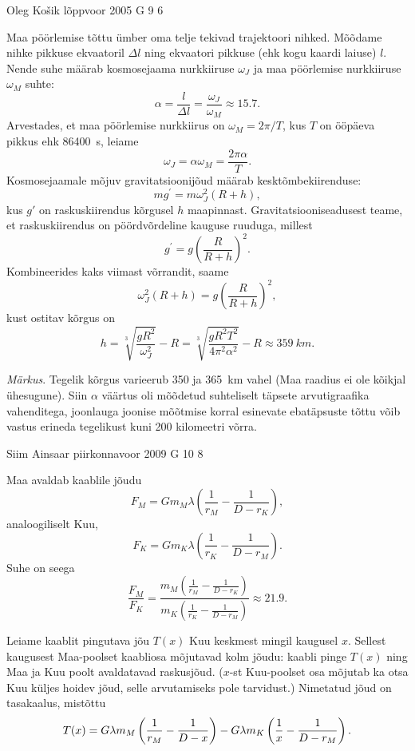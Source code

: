 \documentclass[11pt, twoside]{article}
\begin{document}
{%
{Oleg Košik} %
{lõppvoor} %
{2005} %
{G 9} %
{6} %
{

\ifSolution
Maa pöörlemise tõttu ümber oma telje tekivad trajektoori nihked. Mõõdame nihke pikkuse ekvaatoril $\Delta l$ ning ekvaatori pikkuse (ehk kogu kaardi laiuse) $l$. Nende suhe määrab kosmosejaama nurkkiiruse $\omega_J$ ja maa pöörlemise nurkkiiruse $\omega_M$ suhte:
\[
\alpha=\frac{l}{\Delta l}=\frac{\omega_{J}}{\omega_{M}} \approx \num{15,7}.
\]
Arvestades, et maa pöörlemise nurkkiirus on $\omega_M = 2\pi /T$, kus $T$ on ööpäeva pikkus ehk \SI{86400}{s}, leiame
\[
\omega_J = \alpha \omega_M = \frac{2\pi\alpha}{T}.
\]
Kosmosejaamale mõjuv gravitatsioonijõud määrab kesktõmbekiirenduse:
\[
m g^{\prime}=m \omega_{J}^{2}(R+h),
\]
kus $g'$ on raskuskiirendus kõrgusel $h$ maapinnast. Gravitatsiooniseadusest teame, et raskuskiirendus on pöördvõrdeline kauguse ruuduga, millest
\[
g^{\prime}=g\left(\frac{R}{R+h}\right)^{2}.
\]
Kombineerides kaks viimast võrrandit, saame
\[
\omega_{J}^{2}(R+h)=g\left(\frac{R}{R+h}\right)^{2},
\]
kust ostitav kõrgus on
\[
h=\sqrt[3]{\frac{g R^{2}}{\omega_{J}^{2}}}-R=\sqrt[3]{\frac{g R^{2} T^{2}}{4 \pi^{2} \alpha^{2}}}-R \approx \SI{359}{km}.
\]

\emph{Märkus}. Tegelik kõrgus varieerub \num{350} ja \SI{365}{km} vahel (Maa raadius ei ole kõikjal ühesugune). Siin $\alpha$ väärtus oli mõõdetud suhteliselt täpsete arvutigraafika vahenditega, joonlauga joonise mõõtmise korral esinevate ebatäpsuste tõttu võib vastus erineda tegelikust kuni \num{200} kilomeetri võrra. 
\fi
}

{Siim Ainsaar} %
{piirkonnavoor} %
{2009} %
{G 10} %
{8} %
{

\ifSolution
\osa
Maa avaldab kaablile jõudu
\[ 
F_M = G m_M \lambda \left( \frac{1}{r_M} - \frac{1}{D - r_K} \right),
\]
analoogiliselt Kuu,
\[ 
F_K = G m_K \lambda \left( \frac{1}{r_K} - \frac{1}{D - r_M} \right).
\]
Suhe on seega
\[ \frac{F_M}{F_K} = \frac{ m_M \left( \frac{1}{r_M} - \frac{1}{D -
		r_K} \right) }{ m_K \left( \frac{1}{r_K} - \frac{1}{D - r_M} \right) } \approx
\num{21,9}.\]

\osa
Leiame kaablit pingutava jõu $T(x)$ Kuu keskmest mingil kaugusel $x$. Sellest
kaugusest Maa-poolset kaabliosa mõjutavad kolm jõudu: kaabli pinge $T(x)$ ning
Maa ja Kuu poolt avaldatavad raskusjõud. ($x$-st Kuu-poolset osa mõjutab ka
otsa Kuu küljes hoidev jõud, selle arvutamiseks pole tarvidust.) Nimetatud jõud on
tasakaalus, mistõttu
\[ 
T(x) = G\lambda m_M \left( \frac{1}{r_M} - \frac{1}{D-x} \right) -
G\lambda m_K \left( \frac{1}{x} - \frac{1}{D-r_M} \right) \text. 
\]

}}
\end{document}
